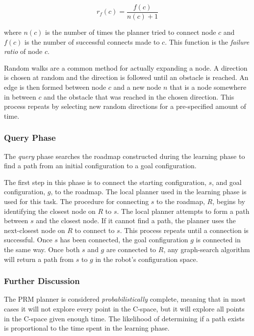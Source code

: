 \documentclass[10pt,conference]{ieeeconf}
\begin{document}
\begin{equation}
r_f(c) = \frac{f(c)}{n(c)+1}
\end{equation}

where $n(c)$ is the number of times the planner tried to connect node $c$ and $f(c)$ is the number of successful connects made to $c$. This function is the \emph{failure ratio} of node $c$.  

Random walks are a common method for actually expanding a node. A direction is chosen at random and the direction is followed until an obstacle is reached. An edge is then formed between node $c$ and a new node $n$ that is a node somewhere in between $c$ and the obstacle that was reached in the chosen direction. This process repeats by selecting new random directions for a pre-specified amount of time.

\subsubsection{Query Phase}

The \emph{query} phase searches the roadmap constructed during the learning phase to find a path from an initial configuration to a goal configuration. 

The first step in this phase is to connect the starting configuration, $s$, and goal configuration, $g$, to the roadmap. The local planner used in the learning phase is used for this task. The procedure for connecting $s$ to the roadmap, $R$, begins by identifying the closest node on $R$ to $s$. The local planner attempts to form a path between $s$ and the closest node. If it cannot find a path, the planner uses the next-closest node on $R$ to connect to $s$. This process repeats until a connection is successful. Once $s$ has been connected, the goal configuration $g$ is connected in the same way. Once both $s$ and $g$ are connected to $R$, any graph-search algorithm will return a path from $s$ to $g$ in the robot's configuration space.

\subsubsection{Further Discussion}

The PRM planner is considered \emph{probabilistically} complete, meaning that in most cases it will not explore every point in the C-space, but it will explore all points in the C-space given enough time. The likelihood of determining if a path exists is proportional to the time spent in the learning phase. 
\end{document}
